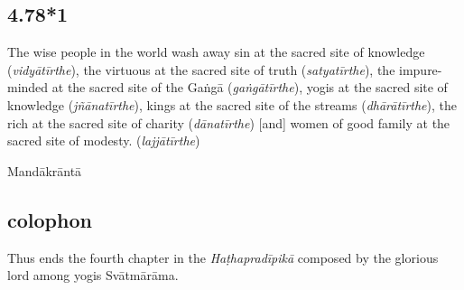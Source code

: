 \begin{ekdosis}
\subsection*{4.78*1}
\begin{translation}[hp04_75_1] The wise people in the world wash away sin at the sacred site of knowledge (\emph{vidyātīrthe}), the virtuous at the sacred site of truth (\emph{satyatīrthe}), the impure-minded at the sacred site of the Gaṅgā (\emph{gaṅgātīrthe}), yogis at the sacred site of knowledge (\emph{jñānatīrthe}), kings at the sacred site of the streams (\emph{dhārātīrthe}), the rich at the sacred site of charity (\emph{dānatīrthe}) [and] women of good family at the sacred site of modesty. (\emph{lajjātīrthe})
\end{translation}
%




\begin{metre}[hp04_078_1]
Mandākrāntā 
\end{metre}

\subsection*{colophon}
\begin{translation}[hp04_col]
Thus ends the fourth chapter in the \emph{Haṭhapradīpikā} composed by the glorious lord among yogis Svātmārāma.    
\end{translation}



\end{ekdosis}

